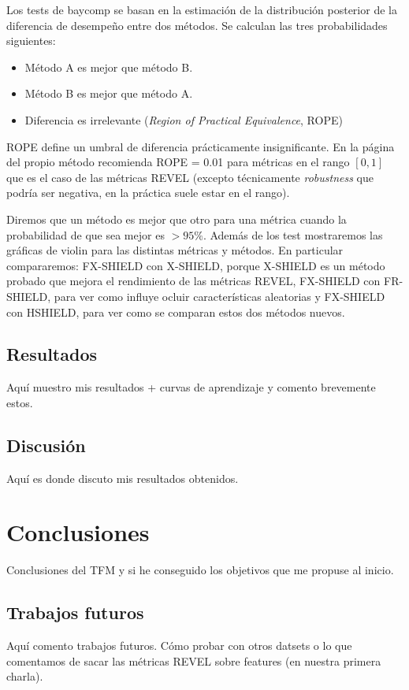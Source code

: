 Los tests de baycomp se basan en la estimación de la distribución posterior de la diferencia de desempeño entre dos métodos. Se calculan las tres probabilidades siguientes:
\begin{itemize}

\item Método A es mejor que método B.
\item Método B es mejor que método A.
\item Diferencia es irrelevante (\textit{Region of Practical Equivalence}, ROPE)

\end{itemize}

ROPE define un umbral de diferencia prácticamente insignificante. En la página del propio método recomienda ROPE = 0.01 para métricas en el rango $[0,1]$ que es el caso de las métricas REVEL (excepto técnicamente \textit{robustness} que podría ser negativa, en la práctica suele estar en el rango).

Diremos que un método es mejor que otro para una métrica cuando la probabilidad de que sea mejor es $>95\%$. Además de los test mostraremos las gráficas de violin para las distintas métricas y métodos. En particular compararemos: FX-SHIELD con X-SHIELD, porque X-SHIELD es un método probado que mejora el rendimiento de las métricas REVEL, FX-SHIELD con FR-SHIELD, para ver como influye ocluir características aleatorias y FX-SHIELD con HSHIELD, para ver como se comparan estos dos métodos nuevos.

\section{Resultados}

Aquí muestro mis resultados + curvas de aprendizaje y comento brevemente estos.

\section{Discusión} \label{sec:discusion}
Aquí es donde discuto mis resultados obtenidos.


\clearpage
\chapter{Conclusiones} \label{cap:conc}
Conclusiones del TFM y si he conseguido los objetivos que me propuse al inicio.

\section{Trabajos futuros}

Aquí comento trabajos futuros. Cómo probar con otros datsets o lo que comentamos de sacar las métricas REVEL sobre features (en nuestra primera charla).


